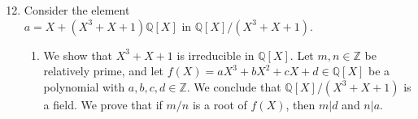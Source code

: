 \documentclass{article}
\begin{document}
\author{Maiko Johannes Nicolaas Bergman, 1259946 \\ Dustin Wilhelmus Maria Bessems, 1228685 \\ Sander Leon Maria Cauberg, 1008909 \\ Guy Jozef Corien Puts, 1232041 \\ Rick Stolk, 1263722}
\title{}
\date{\today}
\newpage
\begin{enumerate}
\setcounter{enumi}{11}
\item Consider the element $a=X+(X^{3}+X+1)\mathbb{Q}[X] \textrm{ in } \mathbb{Q}[X]/(X^{3}+X+1)$.
\begin{enumerate}
\item We show that $X^{3}+X+1$ is irreducible in $\mathbb{Q}[X]$. 
\newline
Let $m, n \in \mathbb{Z}$ be relatively prime, and let $f(X)=aX^{3}+bX^{2}+cX+d \in \mathbb{Q}[X]$ be a polynomial with $a, b, c, d \in \mathbb{Z}$.
\newline
We conclude that $\mathbb{Q}[X]/(X^{3}+X+1)$ is a field.
\newline
We prove that if $m/n$ is a root of $f(X)$, then $m|d$ and $n|a$.
\newline
\end{enumerate}
\end{enumerate}
\end{document}
